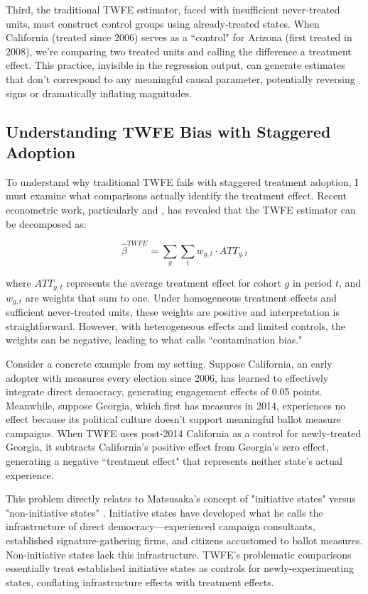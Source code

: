 \documentclass[12pt,letterpaper,oneside]{book}
\begin{document}
Third, the traditional TWFE estimator, faced with insufficient never-treated units, must construct control groups using already-treated states. When California (treated since 2006) serves as a ``control" for Arizona (first treated in 2008), we're comparing two treated units and calling the difference a treatment effect. This practice, invisible in the regression output, can generate estimates that don't correspond to any meaningful causal parameter, potentially reversing signs or dramatically inflating magnitudes.

\subsection{Understanding TWFE Bias with Staggered Adoption}

To understand why traditional TWFE fails with staggered treatment adoption, I must examine what comparisons actually identify the treatment effect. Recent econometric work, particularly \citet{goodman2021difference} and \citet{de2020two}, has revealed that the TWFE estimator can be decomposed as:

$$ \hat{\beta}^{TWFE} = \sum_{g} \sum_{t} w_{g,t} \cdot ATT_{g,t} $$

where $ATT_{g,t}$ represents the average treatment effect for cohort $g$ in period $t$, and $w_{g,t}$ are weights that sum to one. Under homogeneous treatment effects and sufficient never-treated units, these weights are positive and interpretation is straightforward. However, with heterogeneous effects and limited controls, the weights can be negative, leading to what \citet{de2020two} calls ``contamination bias."

Consider a concrete example from my setting. Suppose California, an early adopter with measures every election since 2006, has learned to effectively integrate direct democracy, generating engagement effects of 0.05 points. Meanwhile, suppose Georgia, which first has measures in 2014, experiences no effect because its political culture doesn't support meaningful ballot measure campaigns. When TWFE uses post-2014 California as a control for newly-treated Georgia, it subtracts California's positive effect from Georgia's zero effect, generating a negative ``treatment effect" that represents neither state's actual experience.

This problem directly relates to Matsusaka's concept of "initiative states" versus "non-initiative states" \citep{matsusaka2004many}. Initiative states have developed what he calls the infrastructure of direct democracy—experienced campaign consultants, established signature-gathering firms, and citizens accustomed to ballot measures. Non-initiative states lack this infrastructure. TWFE's problematic comparisons essentially treat established initiative states as controls for newly-experimenting states, conflating infrastructure effects with treatment effects.
\end{document}
